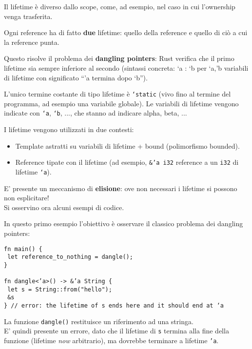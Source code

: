 \documentclass{article}
\begin{document}
Il lifetime è diverso dallo scope, come, ad esempio, nel caso in cui l’ownership venga trasferita.

Ogni reference ha di fatto \textbf{due} lifetime: quello della reference e quello di ciò a cui la reference punta.

Questo risolve il problema dei \textbf{dangling pointers}: Rust verifica che il primo lifetime sia sempre inferiore al secondo (sintassi concreta: ‘a : ‘b per ‘a,’b variabili di lifetime con significato “’a termina dopo ‘b”).

L’unico termine costante di tipo lifetime è \texttt{‘static} (vivo fino al termine del programma, ad esempio una variabile globale). Le variabili di lifetime vengono indicate con \texttt{‘a}, \texttt{‘b}, ..., che stanno ad indicare alpha, beta, ...

I lifetime vengono utilizzati in due contesti:
\begin{itemize}
    \item Template astratti su variabili di lifetime + bound (polimorfismo bounded).
    \item Reference tipate con il lifetime (ad esempio, \texttt{\&’a i32} reference a un \texttt{i32} di lifetime \texttt{‘a}).
\end{itemize}

E' presente un meccanismo di \textbf{elisione}: ove non necessari i lifetime si possono non esplicitare!\vspace{14pt}\\
Si osservino ora alcuni esempi di codice.

In questo primo esempio l'obiettivo è osservare il classico problema dei dangling pointers:
\begin{tcolorbox}
\begin{verbatim}
fn main() {
 let reference_to_nothing = dangle();
}

fn dangle<’a>() -> &’a String {
 let s = String::from("hello");
 &s
} // error: the lifetime of s ends here and it should end at ‘a
\end{verbatim}
\end{tcolorbox}
La funzione \texttt{dangle()} restituisce un riferimento ad una stringa.\\
E' quindi presente un errore, dato che il lifetime di \texttt{s} termina alla fine della funzione (lifetime \textit{now} arbitrario), ma dovrebbe terminare a lifetime \texttt{'a}.\vspace{8pt}
\end{document}
